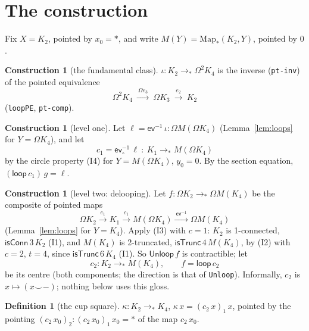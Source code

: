 \documentclass[11pt]{amsart}
\theoremstyle{definition}
\newtheorem{definition}[theorem]{Definition}
\newtheorem{construction}[theorem]{Construction}
\theoremstyle{remark}
\newcommand{\Om}{\Omega}
\newcommand{\Map}{\mathrm{Map}_*}
\newcommand{\code}[1]{\texttt{#1}}
\newcommand{\cT}{\mathsf{isTrunc}}
\newcommand{\cC}{\mathsf{isConn}}
\newcommand{\ev}{\mathsf{ev}}
\newcommand{\lp}{\mathsf{loop}}
\begin{document}
\section{The construction}

Fix $X=K_2$, pointed by $x_0=*$, and write $M(Y)=\Map(K_2,Y)$, pointed by $0$.

\begin{construction}[the fundamental class]\label{c:iota}
$\iota:K_2\to_*\Om^2K_4$ is the inverse (\code{pt-inv}) of the pointed
equivalence
\[\Om^2K_4\ \xrightarrow{\ \Om e_3\ }\ \Om K_3\ \xrightarrow{\ e_2\ }\ K_2\]
(\code{loopPE}, \code{pt-comp}).
\end{construction}

\begin{construction}[level one]\label{c:one}
Let $\ell=\ev^{-1}\,\iota:\Om M(\Om K_4)$ (Lemma~\ref{lem:loops} for
$Y=\Om K_4$), and let
\[c_1=\ev_\circ^{-1}\,\ell\ :\ K_1\to_*M(\Om K_4)\]
by the circle property (I4) for $Y=M(\Om K_4)$, $y_0=0$. By the section
equation, $(\lp\,c_1)\,g=\ell$.
\end{construction}

\begin{construction}[level two: delooping]\label{c:two}
Let $f:\Om K_2\to_*\Om M(K_4)$ be the composite of pointed maps
\[\Om K_2\xrightarrow{\ e_1\ }K_1\xrightarrow{\ c_1\ }M(\Om K_4)
  \xrightarrow{\ \ev^{-1}\ }\Om M(K_4)\]
(Lemma~\ref{lem:loops} for $Y=K_4$). Apply (I3) with $c=1$:
$K_2$ is 1-connected, $\cC\,3\,K_2$ (I1), and $M(K_4)$ is 2-truncated,
$\cT\,4\,M(K_4)$, by (I2) with $c=2$, $t=4$, since
$\cT\,6\,K_4$ (I1). So $\mathsf{Unloop}\,f$ is contractible; let
\[c_2:K_2\to_*M(K_4),\qquad f=\lp\,c_2\]
be its centre (both components; the direction is that of \code{Unloop}).
Informally, $c_2$ is $x\mapsto(x\smile{-})$; nothing below uses this gloss.
\end{construction}

\begin{definition}[the cup square]\label{d:kappa}
$\kappa:K_2\to_*K_4$, $\kappa\,x=(c_2\,x)_1\,x$, pointed by the pointing
$(c_2\,x_0)_2:(c_2\,x_0)_1\,x_0=*$ of the map $c_2\,x_0$.
\end{definition}
\end{document}

